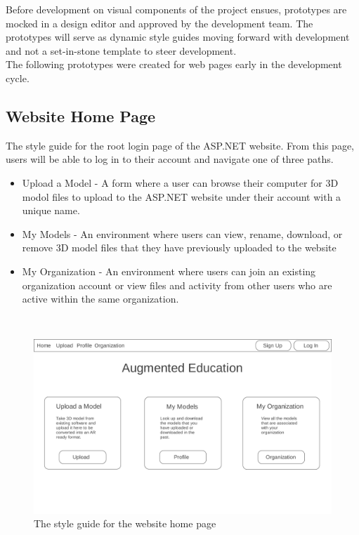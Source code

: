 \hspace{7mm}
Before development on visual components of the project ensues, prototypes are mocked in a
design editor and approved by the development team.  The prototypes will serve
as dynamic style guides moving forward with development and not a set-in-stone template
to steer development.\\

The following prototypes were created for web pages early in the development cycle.

\subsection{Website Home Page}
    \hspace{7mm} The style guide for the root login page of the ASP.NET website.
    From this page, users will be able to log in to their account and navigate 
    one of three paths.
        \begin{itemize} 
            \item Upload a Model -
                A form where a user can browse their computer for 3D modol files to
                upload to the ASP.NET website under their account with a unique name. 
            \item My Models - 
                An environment where users can view, rename, download, or remove
                3D model files that they have previously uploaded to the website
            \item My Organization -
                An environment where users can join an existing organization account
                or view files and activity from other users who are active within 
                the same organization.
        \end{itemize}
    \ \\
    \label{fig:proto_web_home}
    \begin{figure}[H]
        \centering \includegraphics[width=0.6\linewidth]{Home}
        \caption{The style guide for the website home page}
    \end{figure}

